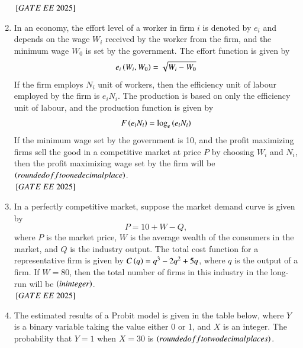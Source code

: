 \documentclass[journal,12pt,onecolumn]{IEEEtran}
\theoremstyle{remark}
\begin{document}
\begin{enumerate}
\begin{center}
\begin{tabular}{|l|c|c|c|}
\hline
\end{tabular}
\end{center}
 ${}\left[GATE\ EE\ 2025\right]$\\
\item In an economy, the effort level of a worker in firm $i$ is denoted by $e_i$ and depends on the wage $W_i$ received by the worker from the firm, and the minimum wage $W_0$ is set by the government. The effort function is given by 
\[
e_i\left(W_i, W_0\right) = \sqrt{W_i - W_0}
\]
If the firm employs $N_i$ unit of workers, then the efficiency unit of labour employed by the firm is $e_i N_i$. The production is based on only the efficiency unit of labour, and the production function is given by
\[
F\left(e_i N_i\right) = \log_e \left(e_i N_i\right)
\]
If the minimum wage set by the government is 10, and the profit maximizing firms sell the good in a competitive market at price $P$ by choosing $W_i$ and $N_i$, then the profit maximizing wage set by the firm will be \underline{\hspace{2cm}} $\left(rounded off to one decimal place\right)$.\\
 ${}\left[GATE\ EE\ 2025\right]$\\
\item In a perfectly competitive market, suppose the market demand curve is given by 
\[
P = 10 + W - Q,
\]
where $P$ is the market price, $W$ is the average wealth of the consumers in the market, and $Q$ is the industry output. The total cost function for a representative firm is given by $C\left(q\right) = q^3 - 2q^2 + 5q$, where $q$ is the output of a firm. If $W = 80$, then the total number of firms in this industry in the long-run will be \underline{\hspace{2cm}} $\left(in integer\right)$.
\\
 ${}\left[GATE\ EE\ 2025\right]$\\
\item The estimated results of a Probit model is given in the table below, where $Y$ is a binary variable taking the value either 0 or 1, and $X$ is an integer. The probability that $Y = 1$ when $X = 30$ is \underline{\hspace{2cm}} $\left(rounded off to two decimal places\right)$.


\end{enumerate}
\end{document}
